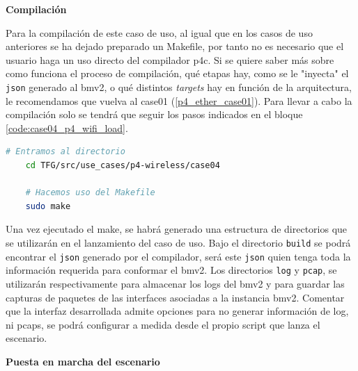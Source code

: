 \vspace{0cm}
\textbf{Compilación}\\
\par

Para la compilación de este caso de uso, al igual que en los casos de uso anteriores se ha dejado preparado un Makefile, por tanto no es necesario que el usuario haga un uso directo del compilador p4c. Si se quiere saber más sobre como funciona el proceso de compilación, qué etapas hay, como se le "inyecta" el \texttt{json} generado al \gls{bmv2}, o qué distintos \textit{targets} hay en función de la arquitectura, le recomendamos que vuelva al case01 (\ref{p4_ether_case01}). Para llevar a cabo la compilación solo se tendrá que seguir los pasos indicados en el bloque \ref{code:case04_p4_wifi_load}.

\begin{lstlisting}[language= bash, style=Consola, caption={Compilación programa P4  - Case04},label=code:case04_p4_wifi_load]
    # Entramos al directorio 
    cd TFG/src/use_cases/p4-wireless/case04

    # Hacemos uso del Makefile
    sudo make
\end{lstlisting}
\vspace{0.5cm}


Una vez ejecutado el make, se habrá generado una estructura de directorios que se utilizarán en el lanzamiento del caso de uso. Bajo el directorio \texttt{build} se podrá encontrar el \texttt{json} generado por el compilador, será este \texttt{json} quien tenga toda la información requerida para conformar el \gls{bmv2}. Los directorios \texttt{log} y \texttt{pcap}, se utilizarán respectivamente para almacenar los logs del \gls{bmv2} y para guardar las capturas de paquetes de las interfaces asociadas a la instancia \gls{bmv2}. Comentar que la interfaz desarrollada admite opciones para no generar información de log, ni pcaps, se podrá configurar a medida desde el propio script que lanza el escenario.\\
\par



\vspace{0.2cm}
\textbf{Puesta en marcha del escenario}\\
\par

